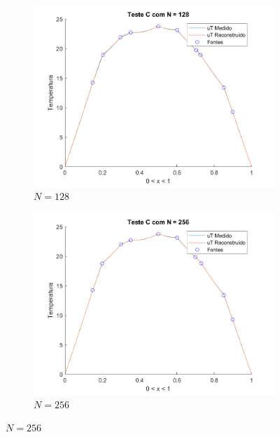 \documentclass[12pt]{article}
\begin{document}
\begin{spacing}{1.5}
\clearpage
\begin{figure}[ht!]
\centering
\caption{Distribuição de temperatura do teste C}
\captionsetup[subfigure]{justification=centering}
    \begin{subfigure}[t]{.485\linewidth}
        \centering
        \includegraphics[width=1\linewidth]{Imagens/FigC128.png}
        \caption{$N=128$}
        \label{fig:testeC_128}
    \end{subfigure}
    \begin{subfigure}[t]{.485\linewidth}
        \centering
        \includegraphics[width=1\linewidth]{Imagens/FigC256.png}
        \caption{$N=256$}
        \label{fig:testeC_256}
    \end{subfigure}

\end{figure}
\end{spacing}
\end{document}
